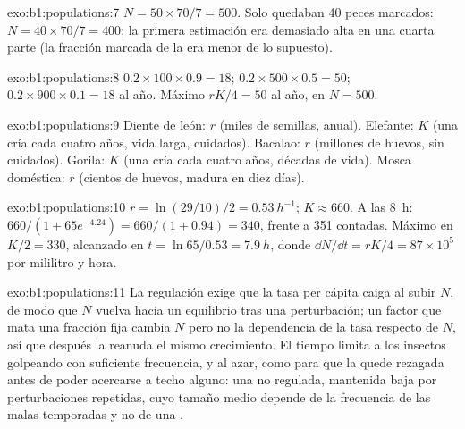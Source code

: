 \begin{solution}{exo:b1:populations:7}
$N = 50\times 70/7 = 500$. Solo quedaban 40 peces marcados: $N = 40\times
70/7 = 400$; la primera estimación era demasiado alta en una cuarta parte
(la fracción marcada de la  era menor de lo supuesto).
\end{solution}

\begin{solution}{exo:b1:populations:8}
$0.2\times 100\times 0.9 = 18$; $0.2\times 500\times 0.5 = 50$;
$0.2\times 900\times 0.1 = 18$ al año. Máximo $rK/4 = 50$ al año, en
$N = 500$.
\end{solution}

\begin{solution}{exo:b1:populations:9}
Diente de león: $r$ (miles de semillas, anual). Elefante: $K$ (una cría cada
cuatro años, vida larga, cuidados). Bacalao: $r$ (millones de huevos, sin
cuidados). Gorila: $K$ (una cría cada cuatro años, décadas de vida). Mosca
doméstica: $r$ (cientos de huevos, madura en diez días).
\end{solution}

\begin{solution}{exo:b1:populations:10}
$r = \ln(29/10)/2 = \qty{0.53}{h^{-1}}$; $K \approx 660$. A las \qty{8}{h}:
$660/(1 + 65e^{-4.24}) = 660/(1 + 0.94) = 340$, frente a 351 contadas.
Máximo en $K/2 = 330$, alcanzado en $t = \ln 65/0.53 = \qty{7.9}{h}$,
donde $\dd N/\dd t = rK/4 = 87\times 10^5$  por mililitro y
hora.
\end{solution}

\begin{solution}{exo:b1:populations:11}
La regulación exige que la tasa per cápita caiga al subir $N$, de modo que
$N$ vuelva hacia un equilibrio tras una perturbación; un factor que mata una
fracción fija cambia $N$ pero no la dependencia de la tasa respecto de $N$,
así que después la  reanuda el mismo crecimiento. El tiempo limita
a los insectos golpeando con suficiente frecuencia, y al azar, como para que
la  quede rezagada antes de poder acercarse a techo alguno: una
 no regulada, mantenida baja por perturbaciones repetidas, cuyo
tamaño medio depende de la frecuencia de las malas temporadas y no de una
.
\end{solution}

